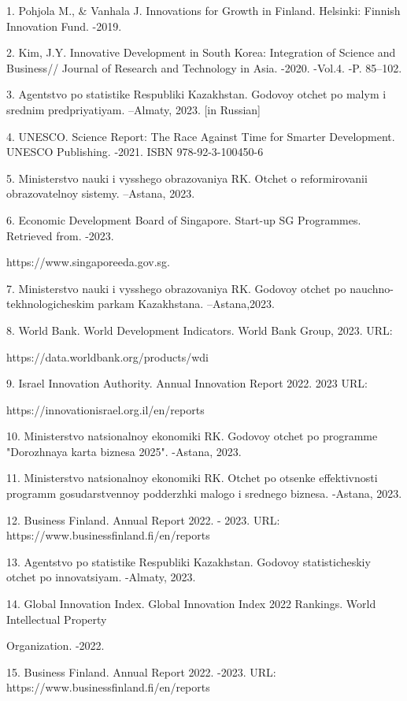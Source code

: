 \begin{noparindent}
1. Pohjola M., \& Vanhala J. Innovations for Growth in Finland.
Helsinki: Finnish Innovation Fund. -2019.

2. Kim, J.Y. Innovative Development in South Korea: Integration of
Science and Business// Journal of Research and Technology in Asia.
-2020. -Vol.4. -P. 85--102.

3. Agentstvo po statistike Respubliki Kazakhstan. Godovoy otchet po
malym i srednim predpriyatiyam. --Almaty, 2023. {[}in Russian{]}

4. UNESCO. Science Report: The Race Against Time for Smarter
Development. UNESCO Publishing. -2021. ISBN 978-92-3-100450-6

5. Ministerstvo nauki i vysshego obrazovaniya RK. Otchet o
reformirovanii obrazovatel\textquotesingle noy sistemy. --Astana, 2023.

6. Economic Development Board of Singapore. Start-up SG Programmes.
Retrieved from. -2023.

https://www.singaporeeda.gov.sg.

7. Ministerstvo nauki i vysshego obrazovaniya RK. Godovoy otchet po
nauchno-tekhnologicheskim parkam Kazakhstana. --Astana,2023.

8. World Bank. World Development Indicators. World Bank Group, 2023.
URL:

https://data.worldbank.org/products/wdi

9. Israel Innovation Authority. Annual Innovation Report 2022. 2023 URL:

https://innovationisrael.org.il/en/reports

10. Ministerstvo natsional\textquotesingle noy ekonomiki RK. Godovoy
otchet po programme "Dorozhnaya karta biznesa 2025". -Astana, 2023.

11. Ministerstvo natsional\textquotesingle noy ekonomiki RK. Otchet po
otsenke effektivnosti programm gosudarstvennoy podderzhki malogo i
srednego biznesa. -Astana, 2023.

12. Business Finland. Annual Report 2022. - 2023. URL:
https://www.businessfinland.fi/en/reports

13. Agentstvo po statistike Respubliki Kazakhstan. Godovoy
statisticheskiy otchet po innovatsiyam. -Almaty, 2023.

14. Global Innovation Index. Global Innovation Index 2022 Rankings.
World Intellectual Property

Organization. -2022.

15. Business Finland. Annual Report 2022. -2023. URL:
https://www.businessfinland.fi/en/reports


\end{noparindent}
